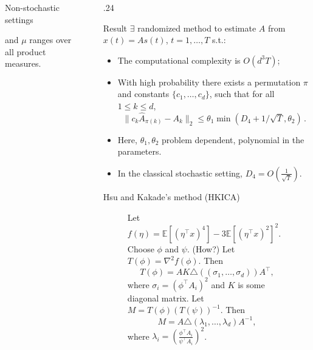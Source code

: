 \documentclass[final]{beamer} %
\newcommand{\EEp}[1]{\mathbb{E}\left[#1\right]}
\begin{document}
\begin{frame}[c]
\begin{columns}[t,totalwidth=\textwidth]
\begin{column}{.24\textwidth}
\begin{block}{Non-stochastic settings}
\begin{itemize}
				and $\mu$ ranges over all product measures.
			\end{itemize}
		\end{block}
	\end{column}
	\begin{column}{0.01\textwidth}
	\end{column}
	\begin{column} {.24\textwidth}
		\begin{block}{Result}
			$\exists$ randomized method to estimate $A$ from $x(t)=A s(t)$, $t=1,\dots,T$ s.t.:
			\begin{itemize}
				\item The computational complexity is $O(d^3 T)$;
				\item With high probability there exists a permutation $\pi$ and 
				constants $\{c_1,\ldots,c_d\}$, such that for all $1\le k\le d$, 
				\[\| 
				c_k\hat{A}_{\pi(k)} - A_k\|_2 \le \theta_1 \min( D_4 + 1/\sqrt{T}, \theta_2 )\,.
				\]
				\vspace{-1.5cm}
				\item Here, $\theta_1,\theta_2$ problem dependent, polynomial in the parameters.
				\item  In the classical stochastic setting, $D_4
				= O(\frac{1}{\sqrt{T}})$.
			\end{itemize}
		\end{block}
		\vspace{0.5ex}
		\begin{block}{Hsu and Kakade's method (HKICA)}
			\begin{figure}
			\begin{algorithmic}[1]
				\STATE Let $f(\eta) = \EEp{(\eta^{\top}x)^4} - 3 \EEp{(\eta^{\top}x)^2}^2$.
				\STATE  Choose $\phi$ and $\psi$. (How?)
				\STATE Let $T(\phi) = \nabla^2 f(\phi)$. Then 
					\[T(\phi) = AK \triangle\left( (\sigma_1,\ldots,  \sigma_d)\right)A^{\top},
					\]
					where $\sigma_i = \left(\phi^{\top}A_i\right)^2$ and $K$ is some diagonal matrix.
				\STATE Let $M = T(\phi)(T(\psi))^{-1}$. Then 
					\[M = A \triangle \left( \lambda_1, \ldots, \lambda_d \right) A^{-1},
					\]
					where $\lambda_i = \left(\frac{\phi^{\top}A_i}{\psi^{\top}A_i}\right)^2$.

\end{algorithmic}
\end{figure}
\end{block}
\end{column}
\end{columns}
\end{frame}
\end{document}
